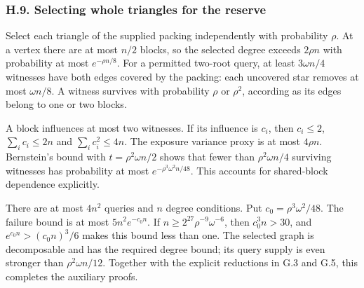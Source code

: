 \documentclass[english,11pt,a4paper]{article}
\begin{document}
\subsubsection{H.9. Selecting whole triangles for the reserve}\label{h.9.-selecting-whole-triangles-for-the-reserve}

Select each triangle of the supplied packing independently with probability \(\rho\). At a vertex there are at most \(n/2\) blocks, so the selected degree exceeds \(2\rho n\) with probability at most \(e^{-\rho n/8}\). For a permitted two-root query, at least \(3\omega n/4\) witnesses have both edges covered by the packing: each uncovered star removes at most \(\omega n/8\). A witness survives with probability \(\rho\) or \(\rho^2\), according as its edges belong to one or two blocks.

A block influences at most two witnesses. If its influence is \(c_i\), then \(c_i\le2\), \(\sum_i c_i\le2n\) and \(\sum_i c_i^2\le4n\). The exposure variance proxy is at most \(4\rho n\). Bernstein's bound with \(t=\rho^2\omega n/2\) shows that fewer than \(\rho^2\omega n/4\) surviving witnesses has probability at most \(e^{-\rho^3\omega^2n/48}\). This accounts for shared-block dependence explicitly.

There are at most \(4n^2\) queries and \(n\) degree conditions. Put \(c_0=\rho^3\omega^2/48\). The failure bound is at most \(5n^2e^{-c_0n}\). If \(n\ge2^{27}\rho^{-9}\omega^{-6}\), then \(c_0^3n>30\), and \(e^{c_0n}>(c_0n)^3/6\) makes this bound less than one. The selected graph is decomposable and has the required degree bound; its query supply is even stronger than \(\rho^2\omega n/12\). Together with the explicit reductions in G.3 and G.5, this completes the auxiliary proofs.
\end{document}

